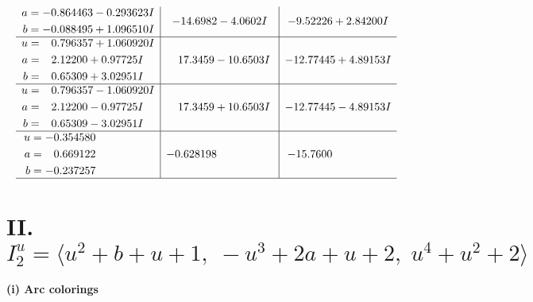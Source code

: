 \documentclass[1p]{elsarticle_modified}
\theoremstyle{definition}
\begin{document}
$$\begin{array}{c|c|c}
\begin{aligned}
a &= -0.864463 - 0.293623 I \\
b &= -0.088495 + 1.096510 I\end{aligned}
 & -14.6982 - 4.0602 I & -9.52226 + 2.84200 I \\ \hline\begin{aligned}
u &= \phantom{-}0.796357 + 1.060920 I \\
a &= \phantom{-}2.12200 + 0.97725 I \\
b &= \phantom{-}0.65309 + 3.02951 I\end{aligned}
 & \phantom{-}17.3459 - 10.6503 I & -12.77445 + 4.89153 I \\ \hline\begin{aligned}
u &= \phantom{-}0.796357 - 1.060920 I \\
a &= \phantom{-}2.12200 - 0.97725 I \\
b &= \phantom{-}0.65309 - 3.02951 I\end{aligned}
 & \phantom{-}17.3459 + 10.6503 I & -12.77445 - 4.89153 I \\ \hline\begin{aligned}
u &= -0.354580\phantom{ +0.000000I} \\
a &= \phantom{-}0.669122\phantom{ +0.000000I} \\
b &= -0.237257\phantom{ +0.000000I}\end{aligned}
 & -0.628198\phantom{ +0.000000I} & -15.7600\phantom{ +0.000000I}\\
 \hline 
 \end{array}$$\newpage\newpage\renewcommand{\arraystretch}{1}
\centering \section*{II. $I^u_{2}= \langle u^2+b+u+1,\;- u^3+2 a+u+2,\;u^4+u^2+2 \rangle$}
\flushleft \textbf{(i) Arc colorings}\\
\end{document}
